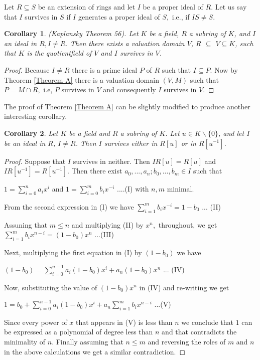 \documentclass{amsproc}
\theoremstyle{plain}
\newtheorem{corollary}{Corollary}
\numberwithin{equation}{section}
\begin{document}
Let $R\subseteq S$ be an extension of rings and let $I$ be a proper ideal of 
$R.$ Let us say that $I$ survives in $S$ if $I$ generates a proper ideal of $%
S,$ i.e., if $IS\neq S.$

\begin{corollary}
\label{Corollary B} (Kaplansky Theorem 56). Let $K$ be a field, $R$ a
subring of $K$, and $I$ an ideal in $R,I\neq R$. Then there exists a
valuation domain $V$, $R$ $\subseteq $ $V\subseteq K$, such that $K$ is the
quotientfield of $V$ and $I$ survives in $V$.
\end{corollary}

\begin{proof}
Because $I\neq R$ there is a prime ideal $P$ of $R$ such that $I\subseteq P.$
Now by Theorem \ref{Theorem A} there is a valuation domain $(V,M)$ such that 
$P=M\cap R,$ i.e, $P$ survives in $V$ and consequently $I$ survives in $V.$
\end{proof}

The proof of Theorem \ref{Theorem A} can be slightly modified to produce
another interesting corollary.

\begin{corollary}
\label{Corollary C} Let $K$ be a field and $R$ a subring of $K$. Let $u\in
K\backslash \{0\}$, and let $I$ be an ideal in $R$, $I\neq R$. Then $I$
survives either in $R[u]$ or in $R[u^{-1}]$.
\end{corollary}

\begin{proof}
Suppose that $I$ survives in neither. Then $IR[u]=R[u]$ and $%
IR[u^{-1}]=R[u^{-1}].$ Then there exist $a_{0},...,a_{n};b_{0},...,b_{m}\in
I $ such that

$1=\sum_{i=0}^{n}a_{i}x^{i}$ and $1=\sum_{i=0}^{m}b_{i}x^{-i}$ ....(I) with $%
n,m$ minimal.

From the second expression in (I) we have $\sum_{i=1}^{m}b_{i}x^{-i}=1-b_{0}$
... (II)

Assuning that $m\leq n$ and multiplying (II) by $x^{n},$ throughout, we get $%
\sum_{i=1}^{m}b_{i}x^{n-i}=(1-b_{0})x^{n}$ ...(III)

Next, multiplying the first equation in (I) by $(1-b_{0})$ we have

$(1-b_{0})=\sum_{i=0}^{n-1}a_{i}(1-b_{0})x^{i}+a_{n}(1-b_{0})x^{n}$ ... (IV)

Now, substituting the value of $(1-b_{0})x^{n}$ in (IV) and re-writing we get

$1=b_{0}+\sum_{i=0}^{n-1}a_{i}(1-b_{0})x^{i}+a_{n}\sum_{i=1}^{m}b_{i}x^{n-i}$
...(V)

Since every power of $x$ that appears in (V) is less than $n$ we conclude
that $1$ can be expressed as a polynomial of degree less than $n$ and that
contradicts the minimality of $n.$ Finally assuming that $n\leq m$ and
reversing the roles of $m$ and $n$ in the above calculations we get a
similar contradiction.
\end{proof}
\end{document}
